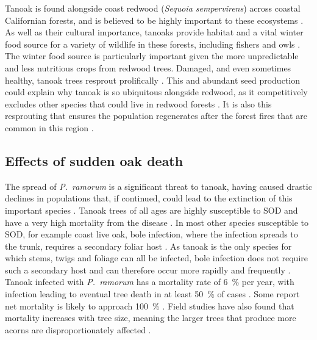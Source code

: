 Tanoak is found alongside coast redwood (\textit{Sequoia sempervirens}) across coastal Californian forests, and is believed to be highly important to these ecosystems \citep{noss_redwood_2000}. As well as their cultural importance, tanoaks provide habitat and a vital winter food source for a variety of wildlife in these forests, including fishers and owls \citep{long_recent_2018}. The winter food source is particularly important given the more unpredictable and less nutritious crops from redwood trees. Damaged, and even sometimes healthy, tanoak trees resprout prolifically \citep{tappeiner_lithocarpus_1990}. This and abundant seed production could explain why tanoak is so ubiquitous alongside redwood, as it competitively excludes other species that could live in redwood forests \citep{ramage_forest_2011}. It is also this resprouting that ensures the population regenerates after the forest fires \citep{mcdonald_california_2002} that are common in this region \citep{ramage_role_2010}.

\subsection{Effects of sudden oak death}

The spread of \textit{P.~ramorum} is a significant threat to tanoak, having caused drastic declines in populations that, if continued, could lead to the extinction of this important species \citep{mcpherson_responses_2010}. Tanoak trees of all ages are highly susceptible to SOD and have a very high mortality from the disease \citep{davis_preimpact_2010}. In most other species susceptible to SOD, for example coast live oak, bole infection, where the infection spreads to the trunk, requires a secondary foliar host \citep{rizzo_phytophthora_2005}. As tanoak is the only species for which stems, twigs and foliage can all be infected, bole infection does not require such a secondary host and can therefore occur more rapidly and frequently \citep{rizzo_sudden_2003}. Tanoak infected with \textit{P.~ramorum} has a mortality rate of \SI{6}{\percent} per year, with infection leading to eventual tree death in at least \SI{50}{\percent} of cases \citep{mcpherson_responses_2010}. Some report net mortality is likely to approach \SI{100}{\percent} \citep{ramage_sudden_2010}. Field studies have also found that mortality increases with tree size, meaning the larger trees that produce more acorns are disproportionately affected \citep{cobb_ecosystem_2012}.

